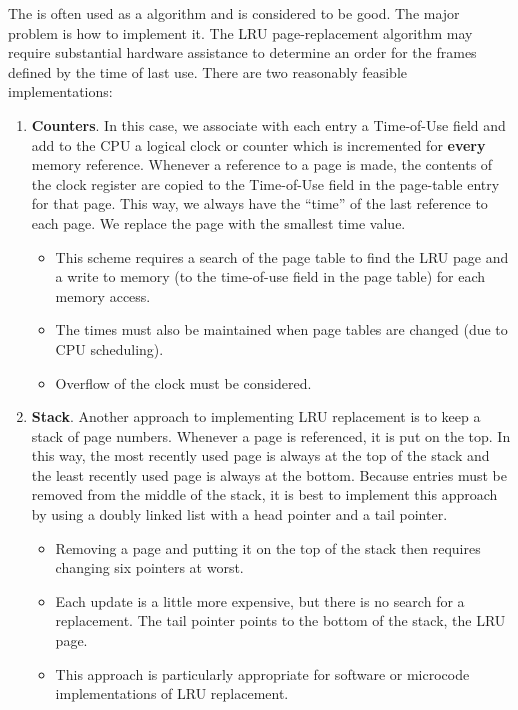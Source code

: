 The  is often used as a  algorithm and is considered to be good.
The major problem is how to implement it.
The LRU page-replacement algorithm may require substantial hardware assistance to determine an order for the frames defined by the time of last use.
There are two reasonably feasible implementations:
\begin{enumerate}[noitemsep]
\item \textbf{Counters}.
  In this case, we associate with each  entry a Time-of-Use field and add to the CPU a logical clock or counter which is incremented for \textbf{every} memory reference.
  Whenever a reference to a page is made, the contents of the clock register are copied to the Time-of-Use field in the page-table entry for that page.
  This way, we always have the ``time'' of the last reference to each page.
  We replace the page with the smallest time value.
  \begin{itemize}[noitemsep]
  \item This scheme requires a search of the page table to find the LRU page and a write to memory (to the time-of-use field in the page table) for each memory access.
  \item The times must also be maintained when page tables are changed (due to CPU scheduling).
  \item Overflow of the clock must be considered.
  \end{itemize}

\item \textbf{Stack}.
  Another approach to implementing LRU replacement is to keep a stack of page numbers.
  Whenever a page is referenced, it is put on the top.
  In this way, the most recently used page is always at the top of the stack and the least recently used page is always at the bottom.
  Because entries must be removed from the middle of the stack, it is best to implement this approach by using a doubly linked list with a head pointer and a tail pointer.
  \begin{itemize}[noitemsep]
  \item Removing a page and putting it on the top of the stack then requires changing six pointers at worst.
  \item Each update is a little more expensive, but there is no search for a replacement.
    The tail pointer points to the bottom of the stack, the LRU page.
  \item This approach is particularly appropriate for software or microcode implementations of LRU replacement.
  \end{itemize}
\end{enumerate}

